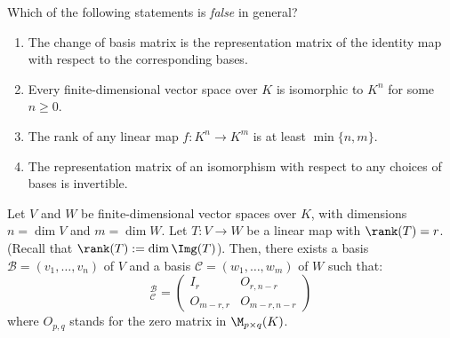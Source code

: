 \begin{exercise}
\label{exc:linear_maps_and_base_changes_sc}
Which of the following statements is \emph{false} in general?
\begin{enumerate}[label=\textbf{(\alph*)}]
    \item The change of basis matrix is the representation matrix of the identity map with respect to the corresponding bases.
    \item Every finite-di\-men\-sional vector space over $K$ is isomorphic to $K^n$ for some $n \ge 0$.
    \item The rank of any linear map $f \colon K^n \to K^m$ is at least $\min\{n, m\}$.
    \item The representation matrix of an isomorphism with respect to any choices of bases is invertible.
\end{enumerate}
\end{exercise}

\begin{proposition}
\label{prop:linear_map_normal_form}
Let $V$ and $W$ be finite-di\-men\-sional vector spaces over $K$, with dimensions $n = \dim V$ and $m = \dim W$. Let $T: V \to W$ be a linear map with $\rank(T) = r$. (Recall that $\rank(T) := \dim \Img(T)$). Then, there exists a basis $\mathcal{B} = (v_1, \dots, v_n)$ of $V$ and a basis $\mathcal{C} = (w_1, \dots, w_m)$ of $W$ such that:
\begin{equation*}
    [T]_{\mathcal{C}}^{\mathcal{B}} = \begin{pmatrix} I_r & O_{r, n-r} \\ O_{m-r, r} & O_{m-r, n-r} \end{pmatrix}
\end{equation*}
where $O_{p,q}$ stands for the zero matrix in $\M_{p \times q}(K)$.
\end{proposition}

